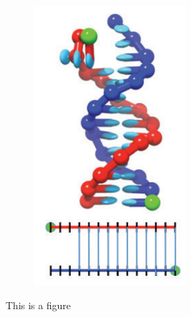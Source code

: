 \begin{figure}[ht]
\begin{centering}
\begin{subfigure}[t]{\dimexpr.2\linewidth-1.3em\relax}
  \includegraphics[width=.8\linewidth,valign=t]{Figures/hybridDiag5.png}
  \end{subfigure}
  \caption{This is a figure \cite{Ouldridge2013}}
  \label{fig:test}
  \end{centering}

\end{figure}

%

